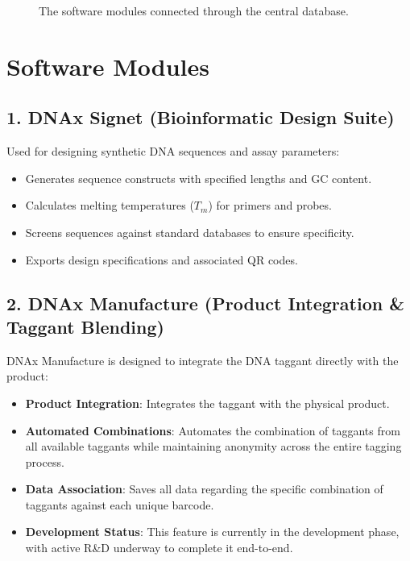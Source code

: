 \begin{figure}[H]
    \caption{The software modules connected through the central database.}
    \label{fig:dms_architecture}
\end{figure}

\section{Software Modules}

\subsection{1. DNAx Signet (Bioinformatic Design Suite)}
Used for designing synthetic DNA sequences and assay parameters:
\begin{itemize}
    \item Generates sequence constructs with specified lengths and GC content.
    \item Calculates melting temperatures ($T_m$) for primers and probes.
    \item Screens sequences against standard databases to ensure specificity.
    \item Exports design specifications and associated QR codes.
\end{itemize}

\subsection{2. DNAx Manufacture (Product Integration \& Taggant Blending)}
DNAx Manufacture is designed to integrate the DNA taggant directly with the product:
\begin{itemize}
    \item \textbf{Product Integration}: Integrates the taggant with the physical product.
    \item \textbf{Automated Combinations}: Automates the combination of taggants from all available taggants while maintaining anonymity across the entire tagging process.
    \item \textbf{Data Association}: Saves all data regarding the specific combination of taggants against each unique barcode.
    \item \textbf{Development Status}: This feature is currently in the development phase, with active R\&D underway to complete it end-to-end.
\end{itemize}


